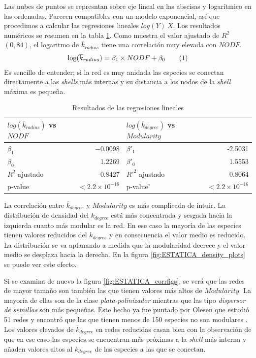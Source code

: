 Las nubes de puntos se represntan sobre eje lineal en las abscisas y logarítmico en las ordenadas. Parecen compatibles con un modelo exponencial, así que procedimos a calcular las regresiones lineales $log(Y) ~ X$. Los resultados numéricos se resumen en la tabla \ref{table:table_lmodel}. Como muestra el valor ajustado de $R^2$ $(0,84)$, el logaritmo de $\overline {k}_{radius}$ tiene una correlación muy elevada con $NODF$. 
\begin{align}
\displaystyle \log({\overline k_{radius}}) = \beta_1 \times NODF + \beta_0
\stepcounter{equation}\tag{\theequation}\label{eq:kradius_vs_nodf}
\end{align}
Es sencillo de entender; si la red es muy anidada las especies se conectan directamente a las \textit{shells} más internas y su distancia a los nodos de la \textit{shell} máxima es pequeña. 

\begin{table}[ht]
\centering
\begin{tabular}{|l r | l r|}
\hline
$log(\overline {k}_{radius})$ vs $NODF$& & $log(\overline {k}_{degree})$ vs $Modularity$ & \\
\hline
$\beta_1$ & $-$0.0098 & $\beta'_1$ & -2.5031 \\
$\beta_0$ & 1.2269 & $\beta'_0$ & 1.5553 \\
$R^2$ ajustado&  0.8427  & $R'^2$ ajustado& 0.8064\\
p-value & $<2.2 \times 10^{-16}$& p-value' & $<2.2 \times 10^{-16}$\\
\hline
\end{tabular}
\caption{\label{table:table_lmodel} Resultados de las regresiones lineales}
\end{table}

La correlación entre $\overline {k}_{degree}$ y $Modularity$ es más complicada de intuir. La distribución de densidad del $k_{degree}$ está más concentrada y sesgada hacia la izquierda cuanto más modular es la red. En ese caso la mayoría de las especies tienen valores reducidos del ${k}_{degree}$ y en consecuencia el valor medio es reducido. La distribución se va aplanando a medida que la modularidad decrece y el valor medio se desplaza hacia la derecha. En la figura \ref{fig:ESTATICA_density_plots} se puede ver este efecto.

Si se examina de nuevo la figura \ref{fig:ESTATICA_corrfigs}, se verá que las redes de mayor tamaño son también las que tienen valores más altos de $Modularity$. La mayoría de ellas son de la clase \textit{plata-polinizador} mientras que las tipo \textit{dispersor de semillas} son más pequeñas. Este hecho ya fue puntado por Olesen que estudió 51 redes y encontró que las que tienen menos de 150 especies no son modulares \cite{olesen2007modularity}. Los valores elevados de $\overline {k}_{degree}$ en redes reducidas casan bien con la observación de que en ese caso las especies se encuentran más próximas a la \textit{shell} más interna y añaden valores altos al ${k}_{degree}$ de las especies a las que se conectan.

